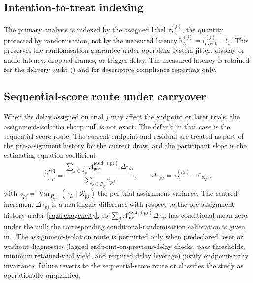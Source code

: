 \documentclass[11pt,a4paper]{article}
\theoremstyle{definition}
\newcommand{\Apre}{A_{\mathrm{pre}}}
\newcommand{\tauL}{\tau_L}
\begin{document}
\subsection{Intention-to-treat indexing}
\label{sec:si-itt}

The primary analysis is indexed by the assigned label \(\tauL^{(j)}\), the
quantity protected by randomisation, not by the measured latency
\(\widetilde{\tau}_L^{(j)}=t_{\mathrm{event}}^{(j)}-t_1\). This preserves the
randomisation guarantee under operating-system jitter, display or audio latency,
dropped frames, or trigger delay. The measured latency is retained for the
delivery audit () and for descriptive
compliance reporting only.

\subsection{Sequential-score route under carryover}
\label{sec:si-sequential}

When the delay assigned on trial \(j\) may affect the endpoint on later trials,
the assignment-isolation sharp null is not exact. The default in that case is the
sequential-score route. The current endpoint and residual are treated as part of
the pre-assignment history for the current draw, and the participant slope is the
estimating-equation coefficient
\begin{equation}
\label{eq:si-sequential-slope}
\widehat{\beta}_{\tau,p}^{\,\mathrm{seq}}
=\frac{\sum_{j\in\mathcal{J}_p}\Apre^{\mathrm{resid},(pj)}\,\Delta\tau_{pj}}
       {\sum_{j\in\mathcal{J}_p}v_{pj}},
\qquad
\Delta\tau_{pj}=\tauL^{(pj)}-\bar\tau_{\mathcal{R}_{pj}},
\end{equation}
with \(v_{pj}=\operatorname{Var}_{P_{\mathrm{sch}}}(\tauL\mid\mathcal{R}_{pj})\)
the per-trial assignment variance. The centred increment
\(\Delta\tau_{pj}\) is a martingale difference with respect to the
pre-assignment history under \eqref{eq:si-exogeneity}, so
\(\sum_j\Apre^{\mathrm{resid},(pj)}\Delta\tau_{pj}\) has conditional mean zero
under the null; the corresponding conditional-randomisation calibration is given
in . The assignment-isolation route is permitted
only when predeclared reset or washout diagnostics (lagged
endpoint-on-previous-delay checks, pass thresholds, minimum retained-trial yield,
and required delay leverage) justify endpoint-array invariance; failure reverts to
the sequential-score route or classifies the study as operationally unqualified.
\end{document}
